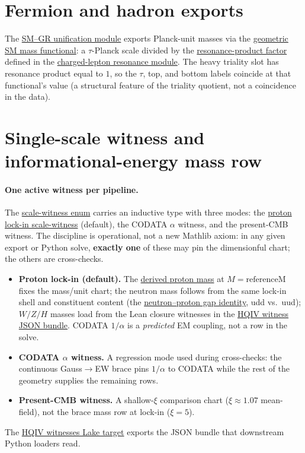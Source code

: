 \documentclass[11pt]{article}
\begin{document}
\section{Fermion and hadron exports}
\label{sec:fermion}

The
\hyperref[lean:sm-gr]{SM--GR unification module} exports
Planck-unit masses via the
\hyperref[lean:sm-mass]{geometric SM mass functional}: a
$\tau$-Planck scale divided by the
\hyperref[lean:resonance-product]{resonance-product factor}
defined in the
\hyperref[lean:lepton-resonance]{charged-lepton resonance
module}. The heavy triality slot has resonance product equal to
$1$, so the $\tau$, top, and bottom labels coincide at that
functional's value (a structural feature of the triality
quotient, not a coincidence in the data).

\section{Single-scale witness and informational-energy mass row}
\label{sec:scale-witness}

\paragraph{One active witness per pipeline.}
The
\hyperref[lean:scale-witness]{scale-witness enum} carries an
inductive type with three modes: the
\hyperref[lean:proton-lockin]{proton lock-in scale-witness}
(default), the CODATA $\alpha$ witness, and the present-CMB
witness. The discipline is operational, not a new Mathlib
axiom: in any given export or Python solve, \textbf{exactly
one} of these may pin the dimensionful chart; the others are
cross-checks.
\begin{itemize}[leftmargin=2em]
  \item \textbf{Proton lock-in (default).} The
    \hyperref[lean:derived-proton]{derived proton mass} at
    $M=\mathrm{referenceM}$ fixes the mass/unit chart; the
    neutron mass follows from the same lock-in shell and
    constituent content (the
    \hyperref[lean:delta-m]{neutron--proton gap identity},
    udd vs.\ uud); $W/Z/H$ masses load from the Lean closure
    witnesses in the
    \hyperref[lean:witnesses-json]{HQIV witness JSON bundle}.
    CODATA $1/\alpha$ \cite{codata2018} is a \emph{predicted}
    EM coupling, not a row in the solve.
  \item \textbf{CODATA $\alpha$ witness.} A regression mode
    used during cross-checks: the continuous Gauss$\to$EW brace
    pins $1/\alpha$ to CODATA while the rest of the geometry
    supplies the remaining rows.
  \item \textbf{Present-CMB witness.} A shallow-$\xi$
    comparison chart ($\xi\approx 1.07$ mean-field), not the
    brace mass row at lock-in ($\xi=5$).
\end{itemize}
The
\hyperref[lean:hqiv-witnesses]{HQIV witnesses Lake target}
exports the JSON bundle that downstream Python loaders read.
\end{document}
